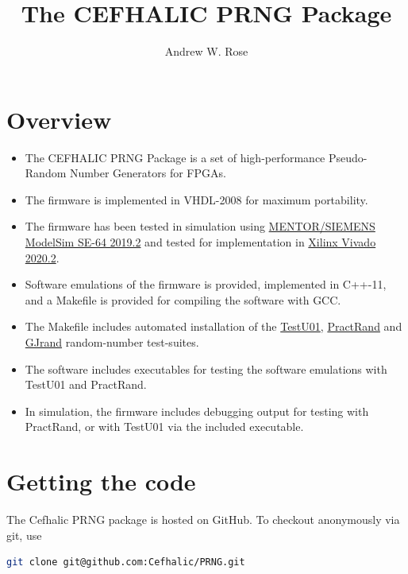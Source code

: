 \documentclass{article}
\title{The CEFHALIC PRNG Package}
\author{Andrew W. Rose}
\begin{document}
\maketitle

\section{Overview}

\begin{itemize}
\item The CEFHALIC PRNG Package is a set of high-performance Pseudo-Random Number Generators for FPGAs. 
\item The firmware is implemented in VHDL-2008 for maximum portability. 
\item The firmware has been tested in simulation using \href{https://eda.sw.siemens.com/en-US/ic/modelsim/}{MENTOR/SIEMENS ModelSim SE-64 2019.2} and tested for implementation in \href{https://www.xilinx.com/products/design-tools/vivado.html}{Xilinx Vivado 2020.2}.
\item Software emulations of the firmware is provided, implemented in C++-11, and a Makefile is provided for compiling the software with GCC.
\item The Makefile includes automated installation of the \href{http://simul.iro.umontreal.ca/testu01/tu01.html}{TestU01}, \href{http://pracrand.sourceforge.net/}{PractRand} and \href{http://gjrand.sourceforge.net/}{GJrand} random-number test-suites.
\item The software includes executables for testing the software emulations with TestU01 and PractRand.
\item In simulation, the firmware includes debugging output for testing with PractRand, or with TestU01 via the included executable.
\end{itemize}

\newpage

\section{Getting the code}

The Cefhalic PRNG package is hosted on GitHub. To checkout anonymously via git, use

\begin{minipage}{1.0\textwidth}
\centering
\begin{lstlisting}[language=bash , label=lst:GitClone]
git clone git@github.com:Cefhalic/PRNG.git
\end{lstlisting}
\end{minipage}
\end{document}
